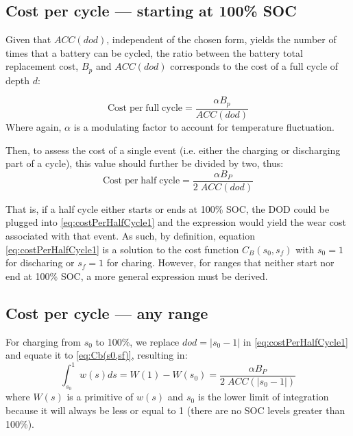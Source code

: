 \documentclass{ieeeaccess}
\begin{document}
    \subsection{Cost per cycle --- starting at 100\% SOC}
    Given that $ACC(dod)$, independent of the chosen form, yields the number of times that a battery can be cycled, the ratio between the battery total replacement cost, $B_p$ and $ACC(dod)$ corresponds to the cost of a full cycle of depth $d$:
    
    $$ \mathrm{Cost \; per \; full \; cycle} = \frac{ \alpha B_p}{ACC(dod)} $$
    Where again, $\alpha$ is a modulating factor to account for temperature fluctuation.
    
    Then, to assess the cost of a single event (i.e. either the charging or discharging part of a cycle), this value should further be divided by two, thus:
    \begin{equation}
        \mathrm{Cost \; per \; half \; cycle} = \frac{ \alpha B_{P}}{2 \; ACC(dod)}
        \label{eq:costPerHalfCycle1}
    \end{equation}

    That is, if a half cycle either starts or ends at 100\% \ac{SOC}, the \ac{DOD} could be plugged into \eqref{eq:costPerHalfCycle1} and the expression would yield the wear cost associated with that event. As such, by definition, equation \eqref{eq:costPerHalfCycle1} is a solution to the cost function $C_{B}(s_{0}, s_{f})$ with $s_0 = 1$ for discharing or $s_f = 1$ for charing. However, for ranges that neither start nor end at 100\% \ac{SOC}, a more general expression must be derived.

    \subsection{Cost per cycle --- any range}

    For charging from $s_0$ to 100\%, we replace $dod=|s_{0}-1|$ in \eqref{eq:costPerHalfCycle1} and equate it to \eqref{eq:Cb(s0,sf)}, resulting in:
    \small
       $$ \int_{s_{0}}^{1}w(s)ds = W(1) - W(s_{0}) = \frac{\alpha B_{P}}{2 \; ACC(|s_{0}-1|)} $$
	\normalsize
    where $W(s)$ is a primitive of $w(s)$ and $s_{0}$ is the lower limit of integration because it will always be less or equal to 1 (there are no \ac{SOC} levels greater than 100\%).

\end{document}
